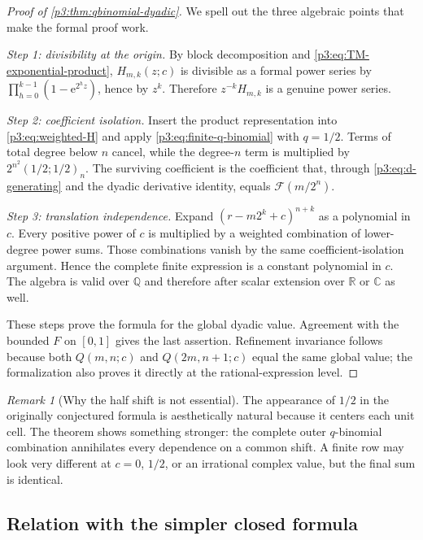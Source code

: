 \documentclass[11pt]{article}
\numberwithin{equation}{section}
\theoremstyle{definition}
\theoremstyle{remark}
\newtheorem{remark}[theorem]{Remark}
\newcommand{\R}{\mathbb R}
\newcommand{\Q}{\mathbb Q}
\newcommand{\C}{\mathbb C}
\newcommand{\GF}{\mathcal F}
\newcommand{\e}{\mathrm e}
\begin{document}
\begin{proof}[Proof of \cref{p3:thm:qbinomial-dyadic}]
We spell out the three algebraic points that make the formal proof work.

\emph{Step 1: divisibility at the origin.}
By block decomposition and \eqref{p3:eq:TM-exponential-product}, $H_{m,k}(z;c)$ is divisible as a formal power series by
$\prod_{h=0}^{k-1}(1-\e^{2^hz})$, hence by $z^k$.  Therefore $z^{-k}H_{m,k}$ is a genuine power series.

\emph{Step 2: coefficient isolation.}
Insert the product representation into \eqref{p3:eq:weighted-H} and apply \eqref{p3:eq:finite-q-binomial} with $q=1/2$.  Terms of total degree below $n$ cancel, while the degree-$n$ term is multiplied by
$2^{n^2}(1/2;1/2)_n$.  The surviving coefficient is the coefficient that, through \eqref{p3:eq:d-generating} and the dyadic derivative identity, equals $\GF(m/2^n)$.

\emph{Step 3: translation independence.}
Expand
$(r-m2^k+c)^{n+k}$ as a polynomial in $c$.  Every positive power of $c$ is multiplied by a weighted combination of lower-degree power sums.  Those combinations vanish by the same coefficient-isolation argument.  Hence the complete finite expression is a constant polynomial in $c$.  The algebra is valid over $\Q$ and therefore after scalar extension over $\R$ or $\C$ as well.

These steps prove the formula for the global dyadic value.  Agreement with the bounded $F$ on $[0,1]$ gives the last assertion.  Refinement invariance follows because both $Q(m,n;c)$ and $Q(2m,n+1;c)$ equal the same global value; the formalization also proves it directly at the rational-expression level.
\end{proof}

\begin{remark}[Why the half shift is not essential]
The appearance of $1/2$ in the originally conjectured formula is aesthetically natural because it centers each unit cell.  The theorem shows something stronger: the complete outer $q$-binomial combination annihilates every dependence on a common shift.  A finite row may look very different at $c=0$, $1/2$, or an irrational complex value, but the final sum is identical.
\end{remark}

\subsection{Relation with the simpler closed formula}
\end{document}
